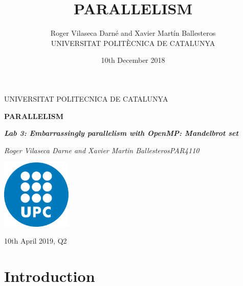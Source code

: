 \documentclass[12pt, a4paper]{article}
\title{PARALLELISM}
\author{Roger Vilaseca Darné and Xavier Martín Ballesteros\\
  \small UNIVERSITAT POLITÈCNICA DE CATALUNYA\\
}
\date{10th December 2018}
\begin{document}
\graphicspath{ {./images} }


\begin{titlepage}
	\centering
	\vspace{1cm}
	{\scshape\Large UNIVERSITAT POLITECNICA DE CATALUNYA\par}
	\vspace{1.5cm}
	{\huge\bfseries PARALLELISM\par}
	\vspace{2cm}
	{\Large\itshape \textbf{Lab 3: Embarrassingly parallelism with OpenMP: Mandelbrot set}\par}
	\vfill
	{\Large\itshape Roger Vilaseca Darne and Xavier Martin Ballesteros\break PAR4110\par}
	\vfill
	\includegraphics[width=0.25\textwidth]{./images/UPC.png}\par\vspace{1cm}

	\vfill

	{\large 10th April 2019, Q2}
\end{titlepage}


\setcounter{secnumdepth}{5}

\newpage
  \tableofcontents
\newpage


\section{Introduction}
\end{document}
